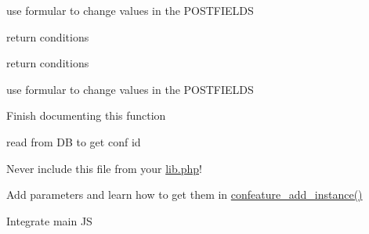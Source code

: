 
\begin{DoxyRefList}
\item[\label{todo__todo000006}%
\hypertarget{todo__todo000006}{}%
Global \hyperlink{locallib_8php_a7dc79dc02ce145c489edd4734a207278}{confeature\-\_\-api\-\_\-create} ()]use formular to change values in the P\-O\-S\-T\-F\-I\-E\-L\-D\-S  
\item[\label{todo__todo000004}%
\hypertarget{todo__todo000004}{}%
Global \hyperlink{locallib_8php_a0034931acefd021a0147a0216bc0a6a8}{confeature\-\_\-api\-\_\-login} ()]return conditions  
\item[\label{todo__todo000005}%
\hypertarget{todo__todo000005}{}%
Global \hyperlink{locallib_8php_a7acfa5bd6b3fa64681a044cfa5360652}{confeature\-\_\-api\-\_\-logout} ()]return conditions  
\item[\label{todo__todo000007}%
\hypertarget{todo__todo000007}{}%
Global \hyperlink{locallib_8php_a64452cfcadb12a7da4c87cdcb94ea6a4}{confeature\-\_\-api\-\_\-update} (int \$id)]use formular to change values in the P\-O\-S\-T\-F\-I\-E\-L\-D\-S  
\item[\label{todo__todo000002}%
\hypertarget{todo__todo000002}{}%
Global \hyperlink{lib_8php_aef534dc463e45aa37218730f6ee5f4e1}{confeature\-\_\-cron} ()]Finish documenting this function  
\item[\label{todo__todo000001}%
\hypertarget{todo__todo000001}{}%
Global \hyperlink{lib_8php_ae40b9e515633066eb722f342cd2588cf}{confeature\-\_\-delete\-\_\-instance} (\$id)]read from D\-B to get conf id  
\item[\label{todo__todo000003}%
\hypertarget{todo__todo000003}{}%
File \hyperlink{locallib_8php}{locallib.php} ]Never include this file from your \hyperlink{lib_8php}{lib.\-php}! 
\item[\label{todo__todo000008}%
\hypertarget{todo__todo000008}{}%
File \hyperlink{mod__form_8php}{mod\-\_\-form.php} ]Add parameters and learn how to get them in \hyperlink{lib_8php_a7e22c75c28ab3ae8b48c1d332f648fc5}{confeature\-\_\-add\-\_\-instance()}  
\item[\label{todo__todo000009}%
\hypertarget{todo__todo000009}{}%
File \hyperlink{view_8php}{view.php} ]Integrate main J\-S 
\end{DoxyRefList}